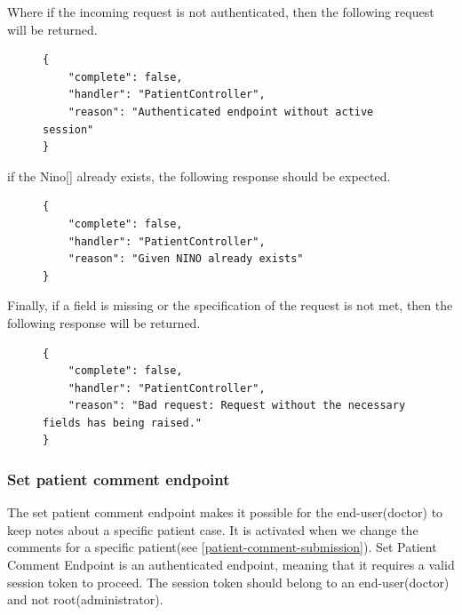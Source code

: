 					Where if the incoming request is not authenticated, then the following request will be returned.
					\begin{figure}[H]
						\iftrue
						\begin{lstlisting}[]
{
	"complete": false,
	"handler": "PatientController",
	"reason": "Authenticated endpoint without active session"
}
						\end{lstlisting}
					\end{figure}
					if the Nino[\cite{nino-format}] already exists, the following response should be expected.
					\begin{figure}[H]
						\iftrue
						\begin{lstlisting}[]
{
	"complete": false,
	"handler": "PatientController",
	"reason": "Given NINO already exists"
}
						\end{lstlisting}
					\end{figure}
					Finally, if a field is missing or the specification of the request is not met, then the following response will be returned.
					\begin{figure}[H]
						\iftrue
						\begin{lstlisting}[]
{
	"complete": false,
	"handler": "PatientController",
	"reason": "Bad request: Request without the necessary fields has being raised."
}					
						\end{lstlisting}
					\end{figure}
				\subsubsection{Set patient comment endpoint}
				
				
					The set patient comment endpoint makes it possible for the end-user(doctor) to keep notes about a specific patient 
					case. It is activated when we change the comments for a specific patient(see \ref{patient-comment-submission}). Set Patient  Comment Endpoint is 
					an authenticated endpoint, meaning that it requires a valid session token to proceed. The session token should 
					belong to an end-user(doctor) and not root(administrator).

